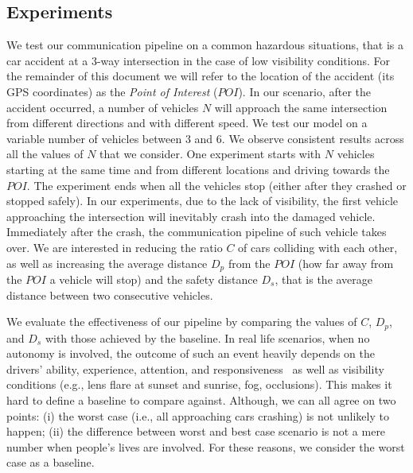 \subsection{Experiments}
We test our communication pipeline on a common hazardous situations, that is a car accident at a 3-way
intersection in the case of low visibility conditions. For the remainder of this document we will refer to the location of
the accident (its GPS coordinates) as the \textit{Point of Interest} ($POI$).
In our scenario, after the accident occurred, a number of
vehicles $N$ will approach the same intersection from different directions and with different speed.
We test our model on a variable number of vehicles between $3$ and $6$. We observe consistent
results across all the values of $N$ that we consider.
One experiment starts with $N$ vehicles starting at the same time and from different locations and
driving towards the $POI$. The experiment ends when all the vehicles stop (either after they crashed
or stopped safely).
In our experiments, due to the lack of visibility, the first vehicle approaching the intersection will inevitably crash
into the damaged vehicle. Immediately after the crash, the communication pipeline of such vehicle takes over.
We are interested in reducing the ratio $C$ of cars colliding with each other, as well as increasing
the average distance $D_p$ from the $POI$ (how far away from the $POI$ a vehicle will stop) and the safety
distance $D_s$, that is the average distance between two consecutive vehicles.

We evaluate the effectiveness of our pipeline by comparing the values of $C$, $D_p$, and $D_s$
with those achieved by the baseline.
In real life scenarios, when no autonomy is involved,
the outcome of such an event heavily depends on the drivers' ability, experience, attention, and
responsiveness~\cite{eby1995analysis} as well as visibility conditions (e.g., lens flare at sunset and
sunrise, fog, occlusions). This makes it hard to define
a baseline to compare against. Although, we can all agree on two points: (i) the worst case (i.e., all approaching
cars crashing) is not unlikely to happen; (ii) the difference between worst and best case scenario is not a mere
number when people's lives are involved. For these reasons, we consider the worst case as a baseline.

